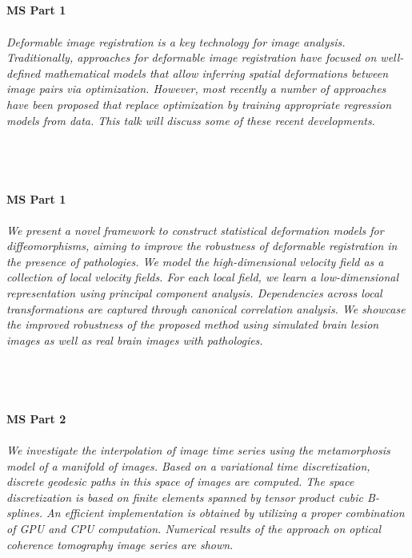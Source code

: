 \begin{multicols}{2}
\\ 
    \\
    \\\\
    \noindent\textbf{MS Part 1}\\
\\  
    \textit{Deformable image registration is a key technology for image analysis. Traditionally, approaches for deformable image registration have focused on well-defined mathematical models that allow inferring spatial deformations between image pairs via optimization. However, most recently a number of approaches have been proposed that replace optimization by training appropriate regression models from data. This talk will discuss some of these recent developments.}\\
\\ 
    \\
    \\\\
    \noindent\textbf{MS Part 1}\\
\\  
    \textit{We present a novel framework to construct statistical deformation models for diffeomorphisms, aiming to improve the robustness of deformable registration in the presence of pathologies. We model the high-dimensional velocity field as a collection of local velocity fields. For each local field, we learn a low-dimensional representation using principal component analysis. Dependencies across local transformations are captured through canonical correlation analysis. We showcase the improved robustness of the proposed method using simulated brain lesion images as well as real brain images with pathologies.}\\
\\ 
    \\
    \\\\
    \noindent\textbf{MS Part 2}\\
\\  
    \textit{We investigate the interpolation of image time series using the metamorphosis model of a manifold of images. Based on a variational time discretization, discrete geodesic paths in this space of images are computed. The space discretization is based on finite elements spanned by tensor product cubic B-splines. An efficient implementation is obtained by utilizing a proper combination of GPU and CPU computation. Numerical results of the approach on optical coherence tomography image series are shown.}\\

\end{multicols}
